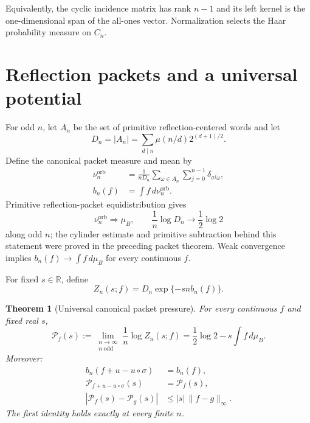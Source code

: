 \documentclass[11pt]{article}
\newtheorem{theorem}{Theorem}[section]
\begin{document}
Equivalently, the cyclic incidence matrix has rank $n-1$ and its left kernel
is the one-dimensional span of the all-ones vector.  Normalization selects
the Haar probability measure on $C_n$.

\section{Reflection packets and a universal potential}

For odd $n$, let $A_n$ be the set of primitive reflection-centered words and
let
\begin{equation}\label{eq:Dn}
 D_n=|A_n|=\sum_{d\mid n}\mu(n/d)2^{(d+1)/2}.
\end{equation}
Define the canonical packet measure and mean by
\begin{align}\label{eq:packetmeasure}
 \nu_n^{\mathrm{orb}}
 &=\frac1{nD_n}\sum_{\omega\in A_n}\sum_{j=0}^{n-1}
   \delta_{\sigma^j\omega},\\
 b_n(f)&=\int f\,d\nu_n^{\mathrm{orb}}.
\end{align}
Primitive reflection-packet equidistribution gives
\begin{equation}\label{eq:equidistribution}
 \nu_n^{\mathrm{orb}}\Longrightarrow\mu_B,
 \qquad
 \frac1n\log D_n\longrightarrow\frac12\log2
\end{equation}
along odd $n$; the cylinder estimate and primitive subtraction behind this
statement were proved in the preceding packet theorem.  Weak convergence
implies $b_n(f)\to\int f\,d\mu_B$ for every continuous $f$.

For fixed $s\in\mathbb R$, define
\begin{equation}\label{eq:Zn}
 Z_n(s;f)=D_n\exp\{-sn b_n(f)\}.
\end{equation}

\begin{theorem}[Universal canonical packet pressure]\label{thm:pressure}
For every continuous $f$ and fixed real $s$,
\begin{equation}\label{eq:pressure}
 \mathcal P_f(s)
 :=\lim_{\substack{n\to\infty\\n\ \mathrm{odd}}}
   \frac1n\log Z_n(s;f)
 =\frac12\log2-s\int f\,d\mu_B.
\end{equation}
Moreover:
\begin{align}
 b_n(f+u-u\circ\sigma)&=b_n(f),\label{eq:finitegauge}\\
 \mathcal P_{f+u-u\circ\sigma}(s)&=\mathcal P_f(s),\label{eq:limitgauge}\\
 |\mathcal P_f(s)-\mathcal P_g(s)|&\le |s|\,\lVert f-g\rVert_\infty.
 \label{eq:lipschitz}
\end{align}
The first identity holds exactly at every finite $n$.
\end{theorem}
\end{document}
